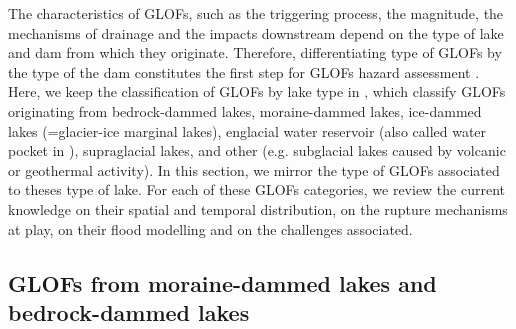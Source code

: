 The characteristics of GLOFs, such as the triggering process, the magnitude, the mechanisms of drainage and the impacts downstream depend on the type of lake and dam from which they originate. Therefore, differentiating type of GLOFs by the type of the dam constitutes the first step for GLOFs hazard assessment \citep{Allen&al2022}. Here, we keep the classification of GLOFs by lake type in \cite{Zhang&al2024}, which classify GLOFs originating from bedrock-dammed lakes, moraine-dammed lakes, ice-dammed lakes (=glacier-ice marginal lakes), englacial water reservoir (also called water pocket in \cite{Lutzow&al2023}), supraglacial lakes, and other (e.g. subglacial lakes caused by volcanic or geothermal activity). In this section, we mirror the type of GLOFs associated to theses type of lake. For each of these GLOFs categories, we review the current knowledge on their spatial and temporal distribution, on the rupture mechanisms at play, on their flood modelling and on the challenges associated. 


\subsection{GLOFs from moraine-dammed lakes and bedrock-dammed lakes}



